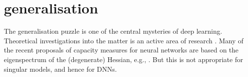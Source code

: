 \documentclass{article} %
\def\lto{\longrightarrow}
\begin{document}


\section{generalisation}\label{section:gen_error}
The generalisation puzzle \citep{DBLP:journals/corr/abs-1801-00173} is one of the central mysteries of deep learning. Theoretical investigations into the matter is an active area of research \citet{neyshabur_exploring_2017}. Many of the recent proposals of capacity measures for neural networks are based on the eigenspectrum of the (degenerate) Hessian, e.g., \citet{thomas_information_2019, maddox_rethinking_2020}. But this is not appropriate for singular models, and hence for DNNs.
\end{document}
